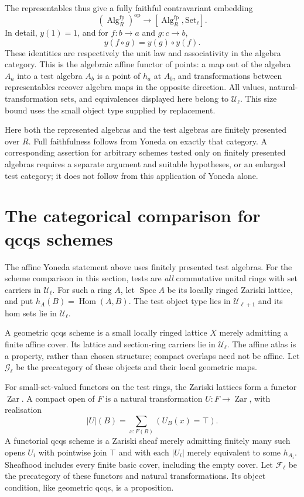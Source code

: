 \documentclass[11pt]{amsart}
\theoremstyle{definition}
\theoremstyle{remark}
\newcommand{\UU}{\mathcal U}
\newcommand{\Set}{\mathrm{Set}}
\newcommand{\Hom}{\operatorname{Hom}}
\newcommand{\Alg}{\operatorname{Alg}}
\begin{document}
The representables thus give a fully faithful contravariant embedding
\[
 (\Alg_R^{\mathrm{fp}})^{\mathrm{op}}
       \longrightarrow[\Alg_R^{\mathrm{fp}},\Set_\ell].
\]
In detail, $y(1)=1$, and for $f:b\to a$ and $g:c\to b$,
\[
 y(f\circ g)=y(g)\circ y(f).
\]
These identities are respectively the unit law and associativity in the
algebra category. This is the algebraic affine functor of points: a map
out of the algebra $A_a$ into a test algebra $A_b$ is a point of $h_a$ at
$A_b$, and transformations between representables recover algebra maps
in the opposite direction. All values, natural-transformation sets, and
equivalences displayed here belong to $\UU_\ell$. This size bound uses
the small object type supplied by replacement.

Here both the represented algebras and the test algebras are finitely
presented over $R$. Full faithfulness follows from Yoneda on exactly that
category. A corresponding assertion for arbitrary schemes tested only
on finitely presented algebras requires a separate argument and suitable
hypotheses, or an enlarged test category; it does not follow from this
application of Yoneda alone.

\section{The categorical comparison for qcqs schemes}
\label{sec:qcqs}

The affine Yoneda statement above uses finitely presented test algebras.
For the scheme comparison in this section, tests are \emph{all}
commutative unital rings with set carriers in $\UU_\ell$. For such a
ring $A$, let $\operatorname{Spec}A$ be its locally ringed Zariski
lattice, and put $h_A(B)=\Hom(A,B)$. The test object type lies in
$\UU_{\ell+1}$ and its hom sets lie in $\UU_\ell$.

A geometric qcqs scheme is a small locally ringed lattice $X$ merely
admitting a finite affine cover. Its lattice and section-ring carriers
lie in $\UU_\ell$. The affine atlas is a property, rather than chosen
structure; compact overlaps need not be affine. Let $\mathcal G_\ell$
be the precategory of these objects and their local geometric maps.

For small-set-valued functors on the test rings, the Zariski lattices
form a functor $\operatorname{Zar}$. A compact open of $F$ is a natural
transformation $U:F\to\operatorname{Zar}$, with realisation
\[
 |U|(B)=\sum_{x:F(B)}(U_B(x)=\top).
\]
A functorial qcqs scheme is a Zariski sheaf merely admitting finitely
many such opens $U_i$ with pointwise join $\top$ and with each $|U_i|$
merely equivalent to some $h_{A_i}$. Sheafhood includes every finite
basic cover, including the empty cover. Let $\mathcal F_\ell$ be the
precategory of these functors and natural transformations. Its object
condition, like geometric qcqs, is a proposition.
\end{document}

